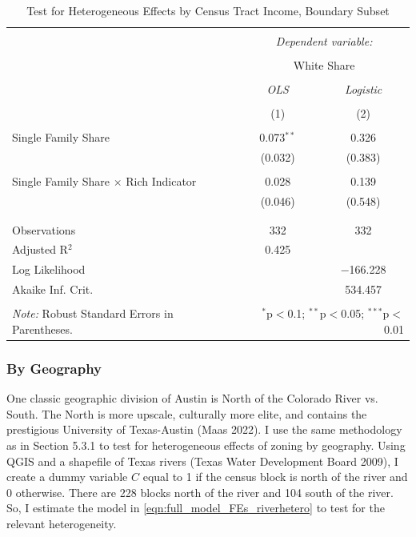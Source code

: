 \documentclass[11pt]{article}
\begin{document}
\begin{table}[!htbp] \centering 
  \caption{Test for Heterogeneous Effects by Census Tract Income, Boundary Subset} 
  \label{tab:income_heterogeneity} 
\begin{tabular}{@{\extracolsep{5pt}}lcc} 
\\[-1.8ex]\hline 
\hline \\[-1.8ex] 
 & \multicolumn{2}{c}{\textit{Dependent variable:}} \\ 
\cline{2-3} 
\\[-1.8ex] & \multicolumn{2}{c}{White Share} \\ 
\\[-1.8ex] & \textit{OLS} & \textit{Logistic} \\ 
\\[-1.8ex] & (1) & (2)\\ 
\hline \\[-1.8ex] 
 Single Family Share & 0.073$^{**}$ & 0.326 \\ 
  & (0.032) & (0.383) \\ 
  & & \\ 
 Single Family Share $\times$ Rich Indicator & 0.028 & 0.139 \\ 
  & (0.046) & (0.548) \\ 
  & & \\ 
\hline \\[-1.8ex] 
Observations & 332 & 332 \\ 
Adjusted R$^{2}$ & 0.425 &  \\ 
Log Likelihood &  & $-$166.228 \\ 
Akaike Inf. Crit. &  & 534.457 \\ 
\hline 
\hline \\[-1.8ex] 
\textit{Note:} Robust Standard Errors in Parentheses.  & \multicolumn{2}{r}{$^{*}$p$<$0.1; $^{**}$p$<$0.05; $^{***}$p$<$0.01} \\ 
\end{tabular} 
\end{table} 

\subsubsection{By Geography}

One classic geographic division of Austin is North of the Colorado River vs. South. The North is more upscale, culturally more elite, and contains the prestigious University of Texas-Austin (Maas 2022). I use the same methodology as in Section 5.3.1 to test for heterogeneous effects of zoning by geography. Using QGIS and a shapefile of Texas rivers (Texas Water Development Board 2009), I create a dummy variable $C$ equal to 1 if the census block is north of the river and 0 otherwise. There are 228 blocks north of the river and 104 south of the river. So, I estimate the model in \ref{eqn:full_model_FEs_riverhetero} to test for the relevant heterogeneity.
\end{document}
